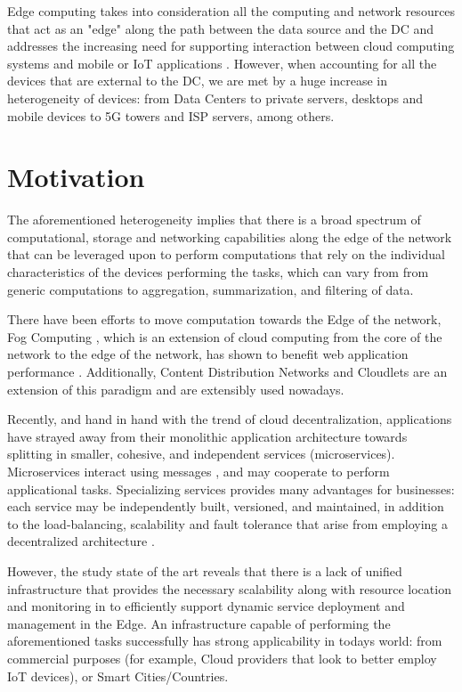 Edge computing takes into consideration all the computing and network resources that act as an "edge" along the path between the data source and the DC and addresses the increasing need for supporting interaction between cloud computing systems and mobile or IoT applications \cite{iot_journal_shi_weisong_and_cao}. However, when accounting for all the devices that are external to the DC, we are met by a huge increase in heterogeneity of devices: from Data Centers to private servers, desktops and mobile devices to 5G towers and ISP servers, among others. 

\section{Motivation}

The aforementioned heterogeneity implies that there is a broad spectrum of
computational, storage and networking capabilities along the edge of the network that can be leveraged upon to perform computations that rely on the individual characteristics of the devices performing the tasks, which can vary from from generic computations to aggregation, summarization, and filtering of data. \cite{DBLP:journals/corr/abs-1805-06989} %

There have been efforts to move computation towards the Edge of the network, Fog Computing \cite{yi2015fog}, which is an extension of cloud computing from the core of the network to the edge of the network, has shown to benefit web application performance \cite{Improving_Web_Sites_Performance_Using_Edge_Servers_in_Fog_Computing_Architecture}. Additionally, Content Distribution Networks \cite{} and Cloudlets \cite{} 
are an extension of this paradigm and are extensibly used nowadays. %

Recently, and hand in hand with the trend of cloud decentralization, applications have strayed away from their monolithic application architecture towards splitting in smaller, cohesive, and independent services (microservices). Microservices interact using messages \cite{Dragoni}, and may cooperate to perform applicational tasks. Specializing services provides many advantages for businesses: each service may be independently built, versioned, and maintained, in addition to the load-balancing, scalability and fault tolerance that arise from employing a decentralized architecture \cite{newman2015building}. 

However, the study state of the art reveals that there is a lack of unified infrastructure that provides the necessary scalability along with resource location and monitoring in to efficiently support dynamic service deployment and management in the Edge. An infrastructure capable of performing the aforementioned tasks successfully has strong applicability in todays world: from commercial purposes (for example, Cloud providers that look to better employ IoT devices), or Smart Cities/Countries.

